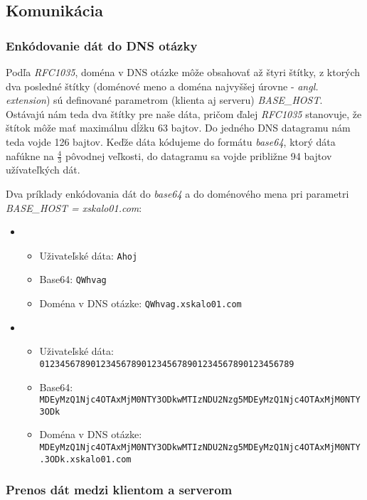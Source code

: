 \documentclass[a4paper]{article}
\begin{document}
  \subsection{Komunikácia}

  \subsubsection{Enkódovanie dát do DNS otázky}

  Podľa \textit{RFC1035}, doména v DNS otázke môže obsahovať až štyri štítky, z
  ktorých dva posledné štítky (doménové meno a doména najvyššej úrovne -
  \textit{angl. extension}) sú definované parametrom (klienta aj serveru)
  \textit{BASE\_HOST}.  Ostávajú nám teda dva štítky pre naše dáta, pričom
  ďalej \textit{RFC1035} stanovuje, že štítok môže mať maximálnu dĺžku 63 bajtov.
  Do jedného DNS datagramu nám teda vojde 126 bajtov. Keďže dáta kódujeme do
  formátu \textit{base64}, ktorý dáta nafúkne na $\frac{4}{3}$ pôvodnej
  veľkosti, do datagramu sa vojde približne 94 bajtov užívateľkých dát.

  Dva príklady enkódovania dát do \textit{base64} a do doménového mena pri
  parametri \textit{BASE\_HOST = xskalo01.com}:
  \begin{itemize}
    \item 
      \begin{itemize}
        \item Uživateľské dáta: \verb|Ahoj|
        \item Base64: \verb|QWhvag|
        \item Doména v DNS otázke: \verb|QWhvag.xskalo01.com|
      \end{itemize}
    \item 
      \begin{itemize}
        \item Uživateľské dáta: \verb|01234567890123456789012345678901234567890123456789|
        \item Base64: \verb|MDEyMzQ1Njc4OTAxMjM0NTY3ODkwMTIzNDU2Nzg5MDEyMzQ1Njc4OTAxMjM0NTY3ODk|
        \item Doména v DNS otázke: \verb|MDEyMzQ1Njc4OTAxMjM0NTY3ODkwMTIzNDU2Nzg5MDEyMzQ1Njc4OTAxMjM0NTY| \\ 
          \verb|.3ODk.xskalo01.com|
      \end{itemize}
  \end{itemize}


  \subsubsection{Prenos dát medzi klientom a serverom}
  \label{label}
\end{document}
